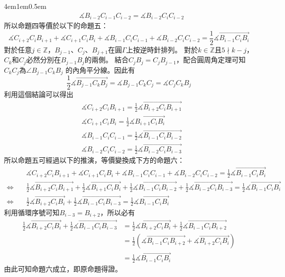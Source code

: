 \documentclass[12pt]{article}
\begin{document}
{\begin{mybox}[證明]{4em}{1em}{0.5em}
\begin{align*}
        &\measuredangle{B_{i-2}C_{i-1}C_{i-2}}=\measuredangle{B_{i-2}C_iC_{i-2}}
    \end{align*}
    所以命題四等價於以下的命題五：
    $$
        \measuredangle{C_{i+2}C_iB_{i+1}}+\measuredangle{C_{i+1}C_iB_i}+\measuredangle{B_{i-1}C_iC_{i-1}}+\measuredangle{B_{i-2}C_iC_{i-2}}
        =\frac{1}{2}\measuredangle{\overrightarrow{B_{i-1}C_iB_i}}
    $$
    對於任意$j\in\mathbb{Z}$，$B_{j-1}$、$C_j$、$B_{j+1}$在圓$\Gamma$上按逆時針排列。
    對於$k\in\mathbb{Z}$且$5\nmid{k-j}$，$C_k$和$C_j$必然分別在$B_{j-1}B_j$的兩側。
    結合$C_jB_j=C_jB_{j-1}$，配合圓周角定理可知 $C_kC_j$為$\angle{B_{j-1}C_kB_j}$ 的內角平分線。因此有
    $$
        \frac{1}{2}\measuredangle{\overrightarrow{B_{j-1}C_kB_j}}=\measuredangle{B_{j-1}C_kC_j}=\measuredangle{C_jC_kB_j}
    $$
    利用這個結論可以得出
    \begin{align*}
        &\measuredangle{C_{i+2}C_iB_{i+1}}=\frac{1}{2}\measuredangle{\overrightarrow{B_{i+2}C_iB_{i+1}}}\\
        &\measuredangle{C_{i+1}C_iB_i}=\frac{1}{2}\measuredangle{\overrightarrow{B_{i+1}C_iB_i}}\\
        &\measuredangle{B_{i-1}C_iC_{i-1}}=\frac{1}{2}\measuredangle\overrightarrow{{B_{i-1}C_iB_{i-2}}}\\
        &\measuredangle{B_{i-2}C_iC_{i-2}}=\frac{1}{2}\measuredangle{\overrightarrow{B_{i-2}C_iB_{i-3}}}
    \end{align*}
    所以命題五可經過以下的推演，等價變換成下方的命題六：
    \begin{align*}
        &\measuredangle{C_{i+2}C_iB_{i+1}}+\measuredangle{C_{i+1}C_iB_i}+\measuredangle{B_{i-1}C_iC_{i-1}}+\measuredangle{B_{i-2}C_iC_{i-2}}
        =\frac{1}{2}\measuredangle{\overrightarrow{B_{i-1}C_iB_i}}\\
        \Leftrightarrow\quad&\frac{1}{2}\measuredangle{\overrightarrow{B_{i+2}C_iB_{i+1}}}+\frac{1}{2}\measuredangle{\overrightarrow{B_{i+1}C_iB_i}}
        +\frac{1}{2}\measuredangle\overrightarrow{{B_{i-1}C_iB_{i-2}}}+\frac{1}{2}\measuredangle{\overrightarrow{B_{i-2}C_iB_{i-3}}}
        =\frac{1}{2}\measuredangle{\overrightarrow{B_{i-1}C_iB_i}}\\
        \Leftrightarrow\quad&\frac{1}{2}\measuredangle{\overrightarrow{B_{i+2}C_iB_i}}+\frac{1}{2}\measuredangle\overrightarrow{{B_{i-1}C_iB_{i-3}}}
        =\frac{1}{2}\measuredangle{\overrightarrow{B_{i-1}C_iB_i}}
    \end{align*}
    利用循環序號可知$B_{i-3}=B_{i+2}$，所以必有
    \begin{align*}
        \frac{1}{2}\measuredangle{\overrightarrow{B_{i+2}C_iB_i}}+\frac{1}{2}\measuredangle\overrightarrow{{B_{i-1}C_iB_{i-3}}}
        &=\frac{1}{2}\measuredangle{\overrightarrow{B_{i+2}C_iB_i}}+\frac{1}{2}\measuredangle\overrightarrow{{B_{i-1}C_iB_{i+2}}}\\
        &=\frac{1}{2}\left(\measuredangle\overrightarrow{{B_{i-1}C_iB_{i+2}}}+\measuredangle{\overrightarrow{B_{i+2}C_iB_i}}\right)\\
        &=\frac{1}{2}\measuredangle{\overrightarrow{B_{i-1}C_iB_i}}
    \end{align*}
    由此可知命題六成立，即原命題得證。
\end{mybox}
}{}
\end{document}
